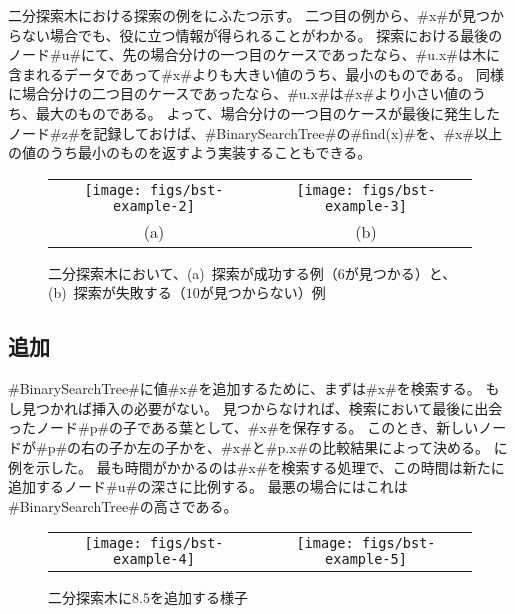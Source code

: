 二分探索木における探索の例をにふたつ示す。
二つ目の例から、#x#が見つからない場合でも、役に立つ情報が得られることがわかる。
探索における最後のノード#u#にて、先の場合分けの一つ目のケースであったなら、#u.x#は木に含まれるデータであって#x#よりも大きい値のうち、最小のものである。
同様に場合分けの二つ目のケースであったなら、#u.x#は#x#より小さい値のうち、最大のものである。
よって、場合分けの一つ目のケースが最後に発生したノード#z#を記録しておけば、#BinarySearchTree#の#find(x)#を、#x#以上の値のうち最小のものを返すよう実装することもできる。

\begin{figure}
  \begin{center}
    \begin{tabular}{cc}
    \texttt{[image: figs/bst-example-2]} &
    \texttt{[image: figs/bst-example-3]} \\
    (a) & (b)
    \end{tabular}
  \end{center}
  \caption{二分探索木において、(a)~探索が成功する例（$6$が見つかる）と、(b)~探索が失敗する（$10$が見つからない）例}
\end{figure}


\subsection{追加}

#BinarySearchTree#に値#x#を追加するために、まずは#x#を検索する。
もし見つかれば挿入の必要がない。
見つからなければ、検索において最後に出会ったノード#p#の子である葉として、#x#を保存する。
このとき、新しいノードが#p#の右の子か左の子かを、#x#と#p.x#の比較結果によって決める。
に例を示した。
最も時間がかかるのは#x#を検索する処理で、この時間は新たに追加するノード#u#の深さに比例する。
最悪の場合にはこれは#BinarySearchTree#の高さである。

\begin{figure}
  \begin{center}
    \begin{tabular}{cc}
    \texttt{[image: figs/bst-example-4]} &
    \texttt{[image: figs/bst-example-5]}
    \end{tabular}
  \end{center}
  \caption{二分探索木に$8.5$を追加する様子}
\end{figure}


